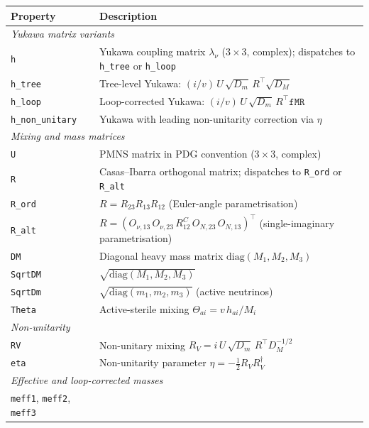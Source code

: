 \documentclass[12pt, a4paper]{article}
\begin{document}
\begin{table}[H]
\centering\small
\renewcommand{\arraystretch}{1.25}
\begin{tabular}{p{5.0cm} p{9.0cm}}
\hline
\textbf{Property} & \textbf{Description} \\
\hline
\multicolumn{2}{l}{\textit{Yukawa matrix variants}} \\
\texttt{h}               & Yukawa coupling matrix $\lambda_\nu$ ($3\times3$, complex);
                            dispatches to \texttt{h\_tree} or \texttt{h\_loop} \\
\texttt{h\_tree}         & Tree-level Yukawa:
                            $(i/v)\,U\,\sqrt{D_m}\,R^\top\!\sqrt{D_M}$ \\
\texttt{h\_loop}         & Loop-corrected Yukawa:
                            $(i/v)\,U\,\sqrt{D_m}\,R^\top\mathtt{fMR}$ \\
\texttt{h\_non\_unitary} & Yukawa with leading non-unitarity correction via $\eta$ \\
\hline
\multicolumn{2}{l}{\textit{Mixing and mass matrices}} \\
\texttt{U}      & PMNS matrix in PDG convention ($3\times3$, complex) \\
\texttt{R}      & Casas--Ibarra orthogonal matrix; dispatches to
                  \texttt{R\_ord} or \texttt{R\_alt} \\
\texttt{R\_ord} & $R=R_{23}R_{13}R_{12}$ (Euler-angle parametrisation) \\
\texttt{R\_alt} & $R=(O_{\nu,13}\,O_{\nu,23}\,R^C_{12}\,O_{N,23}\,O_{N,13})^\top$
                  (single-imaginary parametrisation) \\
\texttt{DM}     & Diagonal heavy mass matrix $\mathrm{diag}(M_1,M_2,M_3)$ \\
\texttt{SqrtDM} & $\sqrt{\mathrm{diag}(M_1,M_2,M_3)}$ \\
\texttt{SqrtDm} & $\sqrt{\mathrm{diag}(m_1,m_2,m_3)}$ (active neutrinos) \\
\texttt{Theta}  & Active-sterile mixing $\Theta_{ai}=v\,h_{ai}/M_i$ \\
\hline
\multicolumn{2}{l}{\textit{Non-unitarity}} \\
\texttt{RV}  & Non-unitary mixing $R_V=i\,U\,\sqrt{D_m}\,R^\top D_M^{-1/2}$ \\
\texttt{eta} & Non-unitarity parameter $\eta=-\tfrac{1}{2}R_V R_V^\dagger$ \\
\hline
\multicolumn{2}{l}{\textit{Effective and loop-corrected masses}} \\
\texttt{meff1}, \texttt{meff2}, \texttt{meff3}

\end{tabular}
\end{table}
\end{document}
